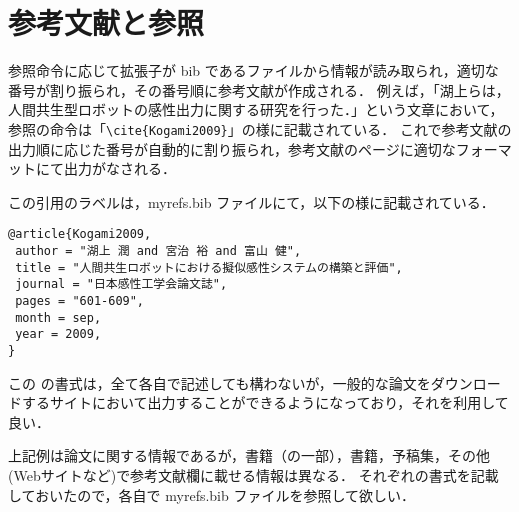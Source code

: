 \section{参考文献と参照}
参照命令に応じて拡張子が bib であるファイルから情報が読み取られ，適切な番号が割り振られ，その番号順に参考文献が作成される．
例えば，「湖上ら\cite{Kogami2009}は，人間共生型ロボットの感性出力に関する研究を行った．」という文章において，参照の命令は「\verb+\cite{Kogami2009}+」の様に記載されている．
これで参考文献の出力順に応じた番号が自動的に割り振られ，参考文献のページに適切なフォーマットにて出力がなされる．

この引用のラベルは，myrefs.bib ファイルにて，以下の様に記載されている．
\begin{breakbox}
{\small
\begin{verbatim}
@article{Kogami2009,
 author = "湖上 潤 and 宮治 裕 and 富山 健",
 title = "人間共生ロボットにおける擬似感性システムの構築と評価",
 journal = "日本感性工学会論文誌",
 pages = "601-609",
 month = sep,
 year = 2009,
}
\end{verbatim}
}
\end{breakbox}
この \BibTeX の書式は，全て各自で記述しても構わないが，一般的な論文をダウンロードするサイトにおいて出力することができるようになっており，それを利用して良い．

上記例は論文に関する情報であるが，書籍（の一部）\cite{WelfareJapan}，書籍\cite{Nakata2010}，予稿集\cite{Miyaji2003ROMAN}，その他(Webサイトなど)\cite{HTUlatex}で参考文献欄に載せる情報は異なる．
それぞれの書式を記載しておいたので，各自で myrefs.bib ファイルを参照して欲しい．
